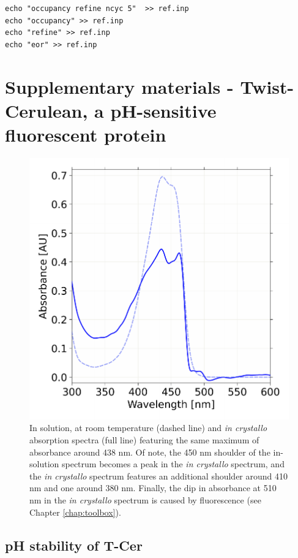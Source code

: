 \begin{verbatim}
echo "occupancy refine ncyc 5"  >> ref.inp
echo "occupancy" >> ref.inp
echo "refine" >> ref.inp
echo "eor" >> ref.inp
\end{verbatim}

\section{Supplementary materials - Twist-Cerulean, a pH-sensitive fluorescent protein}\label{sup:T-Cer}

\begin{figure}
    \centering
    \includegraphics{images/T-Cer/T-Cer_ic_pH8.pdf}
    \caption{ In solution, at room temperature (dashed line) and \textit{in crystallo} absorption spectra (full line) featuring the same maximum of absorbance around 438 nm. Of note, the 450 nm shoulder of the in-solution spectrum becomes a peak in the \textit{in crystallo} spectrum, and the \textit{in crystallo} spectrum features an additional shoulder around 410 nm and one around 380 nm. Finally, the dip in absorbance at 510 nm in the \textit{in crystallo} spectrum is caused by fluorescence (see Chapter \ref{chap:toolbox}).}
    \label{supfig:pH8_spec}
\end{figure}

\subsection{pH stability of T-Cer}

